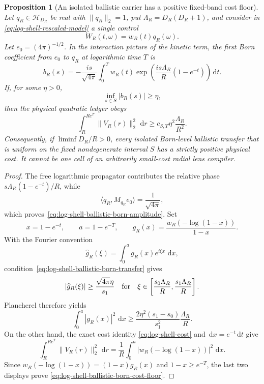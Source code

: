 \documentclass[11pt]{article}
\newtheorem{proposition}[theorem]{Proposition}
\theoremstyle{remark}
\newcommand{\dd}{\,\mathrm d}
\begin{document}
\begin{proposition}[An isolated ballistic carrier has a positive fixed-band
cost floor]
\label{prop:log-shell-ballistic-born-cost}
Let $q_R\in\mathcal H_{D_R}$ be real with $\|q_R\|_2=1$, put
$\Lambda_R=D_R(D_R+1)$, and consider in
\eqref{eq:log-shell-rescaled-model} a single control
\[
 W_R(t,\omega)=w_R(t)q_R(\omega).
\]
Let $e_0=(4\pi)^{-1/2}$.  In the interaction picture of the kinetic term, the
first Born coefficient from $e_0$ to $q_R$ at logarithmic time $T$ is
\begin{equation}
 b_R(s)
 =
 -\frac{is}{\sqrt{4\pi}}
 \int_0^T
 w_R(t)
 \exp\!\left(
  \frac{is\Lambda_R}{R}(1-e^{-t})
 \right)\dd t .
 \label{eq:log-shell-ballistic-born-amplitude}
\end{equation}
If, for some $\eta>0$,
\begin{equation}
 \inf_{s\in S}|b_R(s)|\geq\eta,
 \label{eq:log-shell-ballistic-born-transfer}
\end{equation}
then the physical quadratic ledger obeys
\begin{equation}
 \int_R^{Re^T}\|V_R(r)\|_2^2\,\dd r
 \geq
 c_{S,T}\eta^2\frac{\Lambda_R}{R^2}.
 \label{eq:log-shell-ballistic-born-cost-floor}
\end{equation}
Consequently, if $\liminf D_R/R>0$, every isolated Born-level ballistic
transfer that is uniform on the fixed nondegenerate interval $S$ has a
strictly positive physical cost.  It cannot be one cell of an arbitrarily
small-cost radial lens compiler.
\end{proposition}

\begin{proof}
The free logarithmic propagator contributes the relative phase
$s\Lambda_R(1-e^{-t})/R$, while
\[
 \langle q_R,M_{q_R}e_0\rangle=\frac1{\sqrt{4\pi}},
\]
which proves~\eqref{eq:log-shell-ballistic-born-amplitude}.  Set
\[
 x=1-e^{-t},\qquad a=1-e^{-T},\qquad
 g_R(x)=\frac{w_R(-\log(1-x))}{1-x}.
\]
With the Fourier convention
\[
 \widehat g_R(\xi)=\int_0^ag_R(x)e^{i\xi x}\,\dd x,
\]
condition~\eqref{eq:log-shell-ballistic-born-transfer} gives
\[
 |\widehat g_R(\xi)|
 \geq\frac{\sqrt{4\pi}\eta}{s_1}
 \quad\hbox{for}\quad
 \xi\in
 \left[
  \frac{s_0\Lambda_R}{R},
  \frac{s_1\Lambda_R}{R}
 \right].
\]
Plancherel therefore yields
\[
 \int_0^a|g_R(x)|^2\,\dd x
 \geq
 \frac{2\eta^2(s_1-s_0)}{s_1^2}
 \frac{\Lambda_R}{R}.
\]
On the other hand, the exact cost identity
\eqref{eq:log-shell-cost} and $\dd x=e^{-t}\dd t$ give
\[
 \int_R^{Re^T}\|V_R(r)\|_2^2\,\dd r
 =
 \frac1R\int_0^a
 |w_R(-\log(1-x))|^2\,\dd x.
\]
Since $w_R(-\log(1-x))=(1-x)g_R(x)$ and
$1-x\geq e^{-T}$, the last two displays prove
\eqref{eq:log-shell-ballistic-born-cost-floor}.
\end{proof}
\end{document}
